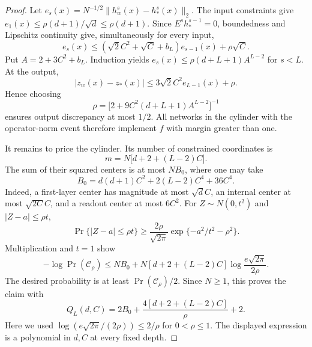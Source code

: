 \begin{proof}
Let $e_s(x)=N^{-1/2}\|h^s_w(x)-h^s_*(x)\|_2$. The input constraints give
$e_1(x)\leq\rho(d+1)/\sqrt d\leq\rho(d+1)$. Since $E^sh^{s-1}_*=0$,
boundedness and Lipschitz continuity give, simultaneously for every input,
\[
 e_s(x)\leq (\sqrt2 C^2+\sqrt C+b_L)e_{s-1}(x)+\rho\sqrt C.
\]
Put $A=2+3C^2+b_L$. Induction yields
$e_s(x)\leq\rho(d+L+1)A^{L-2}$ for $s<L$. At the output,
\[
 |z_w(x)-z_*(x)|
 \leq3\sqrt2 C^2 e_{L-1}(x)+\rho.
\]
Hence choosing
\[
 \rho=\bigl[2+9C^2(d+L+1)A^{L-2}\bigr]^{-1}
\]
ensures output discrepancy at most $1/2$. All networks in the cylinder with
the operator-norm event therefore implement $f$ with margin greater than one.

It remains to price the cylinder. Its number of constrained coordinates is
\[
 m=N\bigl[d+2+(L-2)C\bigr].
\]
The sum of their squared centers is at most $NB_0$, where one may take
\[
 B_0=d(d+1)C^2+2(L-2)C^4+36C^4.
\]
Indeed, a first-layer center has magnitude at most $\sqrt d C$, an internal
center at most $\sqrt{2C}C$, and a readout center at most $6C^2$.
For $Z\sim N(0,t^2)$ and $|Z-a|\leq\rho t$,
\[
 \Pr\{|Z-a|\leq\rho t\}
 \geq\frac{2\rho}{\sqrt{2\pi}}
       \exp\{-a^2/t^2-\rho^2\}.
\]
Multiplication and $t=1$ show
\[
 -\log\Pr(\mathcal C_\rho)
 \leq N B_0
 +N[d+2+(L-2)C]\log\frac{e\sqrt{2\pi}}{2\rho}.
\]
The desired probability is at least $\Pr(\mathcal C_\rho)/2$. Since $N\geq1$, this proves the claim with
\[
 Q_L(d,C)=2B_0+\frac{4[d+2+(L-2)C]}{\rho}+2.
\]
Here we used $\log(e\sqrt{2\pi}/(2\rho))\leq2/\rho$ for $0<\rho\leq1$.
The displayed expression is a polynomial in $d,C$ at every fixed depth.
\end{proof}
